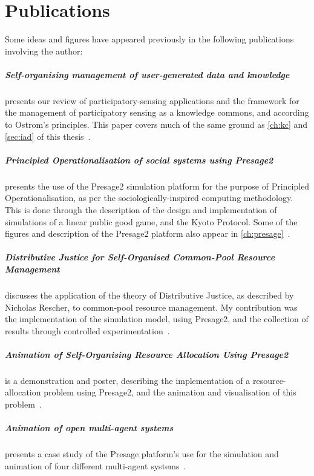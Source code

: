 \chapter*{Publications}
Some ideas and figures have appeared previously in the following publications involving the author:

\bigskip

\paragraph{Self-organising management of user-generated data and
knowledge}  presents our review of participatory-sensing applications and the framework for the management of participatory
sensing as a knowledge commons, and according to Ostrom's principles. This
paper covers much of the same ground as \autoref{ch:kc} and \autoref{sec:iad}
of this thesis~\citep{MacbethKER2014}.

\paragraph{Principled Operationalisation of social systems using
Presage2} presents the use of the Presage2 simulation
platform for the purpose of Principled Operationalisation, as per the
sociologically-inspired computing methodology. This is done through the
description of the design and implementation of simulations of a linear public
good game, and the Kyoto Protocol. Some of the figures and description of the
Presage2 platform also appear in \autoref{ch:presage}~\citep{Macbeth2014}.

\paragraph{Distributive Justice for Self-Organised Common-Pool Resource
Management} discusses the application of the theory of
Distributive Justice, as described by Nicholas Rescher, to common-pool
resource management. My contribution was the implementation of the simulation
model, using Presage2, and the collection of results through controlled
experimentation~\citep{Pitt2014}.

\paragraph{Animation of Self-Organising Resource Allocation Using
Presage2} is a demonstration and poster, describing the
implementation of a resource-allocation problem using Presage2, and the
animation and visualisation of this problem~\citep{Macbeth2012}.

\paragraph{Animation of open multi-agent systems} presents a
case study of the Presage platform's use for the simulation and animation of
four different multi-agent systems~\citep{Pitt2011}.
